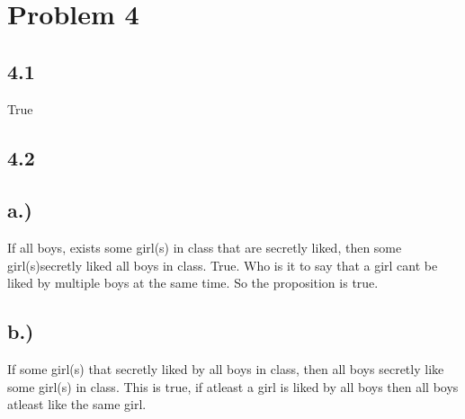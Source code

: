 \documentclass{article}
\begin{document}
\section*{Problem 4}
\subsection*{4.1}
True
\subsection*{4.2}
\subsection*{a.)}
If all boys, exists some girl(s) in class that are secretly liked, then some girl(s)secretly liked all boys in class. True. Who is it to say that a girl cant be liked by multiple boys at the same time. So the proposition is true.
\subsection*{b.)}
If some girl(s) that secretly liked by all boys in class, then all boys secretly like some girl(s) in class. This is true, if atleast a girl is liked by all boys then all boys atleast like the same girl. 
\end{document}
